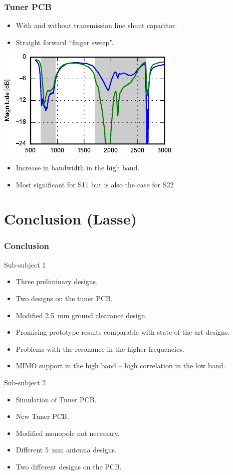 \begin{frame}
  \frametitle{Tuner PCB}
  \begin{itemize}
  \item With and without transmission line shunt capacitor.
  \item Straight forward ``finger sweep''.
  \end{itemize}
\begin{center}
    \includegraphics[scale=1.4]{img/Lasse/tuner_pcb/003_s11top.pdf}
\end{center}
\begin{itemize}
\item Increase in bandwidth in the high band.
\item Most significant for S11 but is also the case for S22 
\end{itemize}
\legendfooter
\end{frame}

\section[Conclusion]{Conclusion (Lasse)}
\begin{frame}
  \frametitle{Conclusion}
  \begin{block}{Sub-subject 1}
    \begin{itemize}
    \item Three preliminary designs.
    \item Two designs on the tuner PCB.
    \item Modified \SI{2.5}{mm} ground clearance design.
    \item Promising prototype results comparable with state-of-the-art designs.
    \item Problems with the resonance in the higher frequencies.
    \item MIMO support in the high band -- high correlation in the low band.
    \end{itemize}
  \end{block}
  \begin{block}{Sub-subject 2}
    \begin{itemize}
    \item Simulation of Tuner PCB.
    \item New Tuner PCB.
    \item Modified monopole not necessary. 
    \item Different \SI{5}{mm} antenna designs.
    \item Two different designs on the PCB.
    \end{itemize}
  \end{block}
\end{frame}
